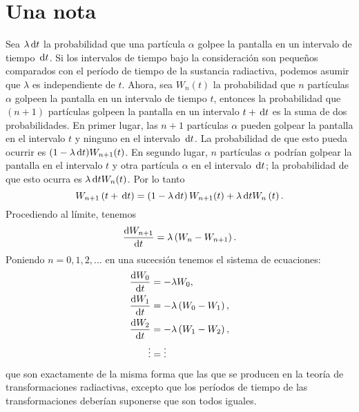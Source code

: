 \section{Una nota}
\label{sec:note}

Sea $\lambda\dl t$ la probabilidad que una partícula $\alpha$ golpee la pantalla en un intervalo de tiempo $\dl t$. Si los intervalos de tiempo bajo la consideración son pequeños comparados con el período de tiempo de la sustancia radiactiva, podemos asumir que $\lambda$ es independiente de $t$. Ahora, sea $W_n(t)$ la probabilidad que $n$ partículas $\alpha$ golpeen la pantalla en un intervalo de tiempo $t$, entonces la probabilidad que $(n+1)$ partículas golpeen la pantalla en un intervalo $t+\dl t$ es la suma de dos probabilidades. En primer lugar, las $n+1$ partículas $\alpha$ pueden golpear la pantalla en el intervalo $t$ y ninguno en el intervalo $\dl t$. La probabilidad de que esto pueda ocurrir es $(1-\lambda\dl t)W_{n+1}(t)$. En segundo lugar, $n$ partículas $\alpha$ podrían golpear la pantalla en el intervalo $t$ y otra partícula $\alpha$ en el intervalo $\dl t$; la probabilidad de que esto ocurra es $\lambda\dl t W_n(t)$. Por lo tanto
\begin{equation*}
  W_{n+1}\left(t+\dl t\right)=\left(1-\lambda\dl t\right)W_{n+1}(t)+\lambda\dl t W_n\left(t\right).
\end{equation*}
Procediendo al límite, tenemos
\begin{equation*}
  \diff{W_{n+1}}{t}=\lambda\left(W_n-W_{n+1}\right).
\end{equation*}
Poniendo $n=0,1,2,\ldots$ en una sucecsión tenemos el sistema de ecuaciones:
\begin{align*}
  \diff{W_0}{t}&=-\lambda W_0,\\
  \diff{W_1}{t}&=-\lambda\left(W_0-W_1\right),\\
  \diff{W_2}{t}&=-\lambda\left(W_1-W_2\right),\\
  \vdots &=\vdots\\%
\end{align*}
que son  exactamente de la misma forma que las que se producen en la teoría de transformaciones radiactivas, excepto que los períodos de tiempo de las transformaciones deberían suponerse que son todos iguales.

